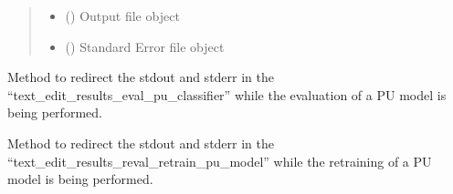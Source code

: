 \documentclass[letterpaper,10pt,english]{sphinxmanual}
\begin{document}
\begin{fulllineitems}
\begin{fulllineitems}
\begin{quote}
\begin{description}
\begin{itemize}
\item {} 
\sphinxAtStartPar
{} () \textendash{} Output file object

\item {} 
\sphinxAtStartPar
{} () \textendash{} Standard Error file object

\end{itemize}

\end{description}\end{quote}

\end{fulllineitems}


\begin{fulllineitems}
\label{\detokenize{gui_main_window:src.graphical_user_interface.main_window.MainWindow.append_text_evaluate}}
\sphinxAtStartPar
Method to redirect the stdout and stderr in the “text\_edit\_results\_eval\_pu\_classifier”
while the evaluation of a PU model is being performed.

\end{fulllineitems}


\begin{fulllineitems}
\label{\detokenize{gui_main_window:src.graphical_user_interface.main_window.MainWindow.append_text_retrain_reval}}
\sphinxAtStartPar
Method to redirect the stdout and stderr in the “text\_edit\_results\_reval\_retrain\_pu\_model”
while the retraining of a PU model is being performed.

\end{fulllineitems}



\end{fulllineitems}
\end{document}
